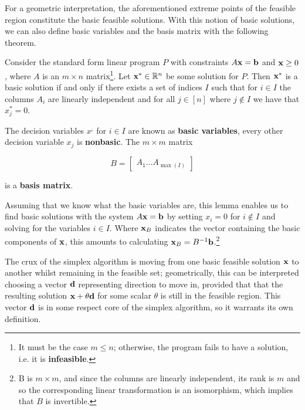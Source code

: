 \documentclass{paper}
\newenvironment{lemma}[2][Lemma]{\begin{trivlist}
\item[\hskip \labelsep {\bfseries #1}\hskip \labelsep {\bfseries #2.}]}{\end{trivlist}}
\newenvironment{definition}[2][Definition]{\begin{trivlist}
\item[\hskip \labelsep {\bfseries #1}\hskip \labelsep {\bfseries #2.}]}{\end{trivlist}}
\newenvironment{gbox}{\begin{tcolorbox}[breakable,colback=green!20!white,colframe=green!10!black]}{\end{tcolorbox}}
\begin{document}
\bigskip
For a geometric interpretation, the aforementioned extreme points of the feasible region constitute the basic feasible solutions. With this notion of basic solutions, we can also define basic variables and the basis matrix with the following theorem.

\bigskip
\begin{gbox}
    \begin{lemma}{(Basicity)}
        Consider the standard form linear program $P$ with constraints $A\bold{x}=\bold{b}$ and $\bold{x} \geq 0$, where $A$ is an $m \times n$ matrix\footnote{It must be the case $m \leq n$; otherwise, the program fails to have a solution, i.e. it is \textbf{infeasible}.}. Let $\bold{x}^* \in \mathbb{R}^n$ be some solution for $P$. Then $\bold{x}^*$ is a basic solution if and only if there exists a set of indices $I$ such that for $i \in I$ the columns $A_i$ are linearly independent and for all $j \in [n]$ where $j \not \in I$ we have that $x^*_j = 0$. 
    \end{lemma}
    \begin{definition}{(Basic variables and basis matrix)}
        The decision variables $x^_i$ for $i \in I$ are known as \textbf{basic variables}, every other decision variable $x_j$ is \textbf{nonbasic}. The $m \times m$ matrix
        
        \[ B = \begin{bmatrix}A_1 \dots A_{\max{(I)}}\end{bmatrix} \]
        
        is a \textbf{basis matrix}.
    \end{definition}
\end{gbox}

\bigskip
Assuming that we know what the basic variables are, this lemma enables us to find basic solutions with the system $A\bold{x} = \bold{b}$ by setting $x_i = 0 $ for $i \not \in I$ and solving for the variables $i \in I$. Where $\bold{x}_B$ indicates the vector containing the basic components of $\bold{x}$, this amounts to calculating $\bold{x}_B = B^{-1}\bold{b}$.\footnote{B is $m \times m$, and since the columns are linearly independent, its rank is $m$ and so the corresponding linear transformation is an isomorphism, which implies that $B$ is invertible.}

\medskip
The crux of the simplex algorithm is moving from one basic feasible solution $\bold{x}$ to another whilst remaining in the feasible set; geometrically, this can be interpreted choosing a vector $\bold{d}$ representing direction to move in, provided that that the resulting solution $\bold{x} + \theta \bold{d}$ for some scalar $\theta$ is still in the feasible region. This vector $\bold{d}$ is in some respect core of the simplex algorithm, so it warrants its own definition.
\end{document}
